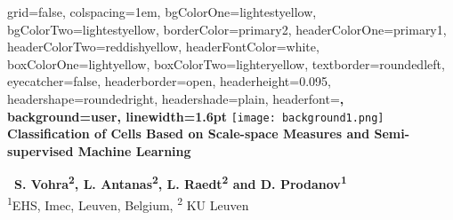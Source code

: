 \documentclass[portrait,final,a0paper]{baposter}
\begin{document}
\newlength{\leftimgwidth}
\begin{poster}%
  {
  grid=false,
  colspacing=1em,
  bgColorOne=lightestyellow,
  bgColorTwo=lightestyellow,
  borderColor=primary2,
  headerColorOne=primary1,
  headerColorTwo=reddishyellow,
  headerFontColor=white,
  boxColorOne=lightyellow,
  boxColorTwo=lighteryellow,
  textborder=roundedleft,
  eyecatcher=false,
  headerborder=open,
  headerheight=0.095\textheight,
  headershape=roundedright,
  headershade=plain,
  headerfont=\Large\sf\bf, %
  background=user,
  linewidth=1.6pt
  }
  {\texttt{[image: background1.png]}} %
  {
  \vspace{2.2em}
  \color{primary1}
  \textbf{
  Classification of Cells Based on Scale-space Measures and Semi-supervised Machine Learning}
  }
  {
  \vspace{0.5em}\textbf{\ S. Vohra\textsuperscript{2}, L. Antanas\textsuperscript{2}, L. Raedt\textsuperscript{2} and D. Prodanov\textsuperscript{1}}\\
   \textsuperscript{1}EHS, Imec, Leuven, Belgium, \textsuperscript{2} KU Leuven\\
   \vspace{1.94em}
    
  }
  {%
  }
   
    
 

\end{poster}
\end{document}
